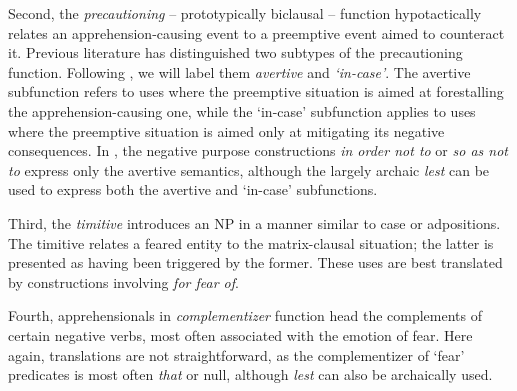 \documentclass[output=paper,colorlinks,citecolor=brown]{langscibook}
\begin{document}
{Second, the \emph{precautioning} -- prototypically biclausal -- function hypotactically relates an apprehension-causing event to a preemptive event aimed to counteract it. Previous literature has distinguished two subtypes of the precautioning function. Following \citet{lichtenberk1995apprehensional}, we will label them \textit{avertive} and \textit{`in-case'}. The avertive subfunction refers to uses where the preemptive situation is aimed at forestalling the apprehension-causing one, while the `in-case' subfunction applies to uses where the preemptive situation is aimed only at mitigating its negative consequences. In , the negative purpose constructions \textit{in order not to} or \textit{so as not to} express only the avertive semantics, although the largely archaic \textit{lest} can be used to express both the avertive and `in-case' subfunctions.}

Third, the \emph{timitive} introduces an NP in a manner similar to case or adpositions. The timitive relates a feared entity to the matrix-clausal situation; the latter is presented as having been triggered by the former. These uses are best translated by  constructions involving \textit{for fear of}.

Fourth, apprehensionals in \textit{complementizer} function head the complements of certain negative verbs, most often associated with the emotion of fear. Here again,  translations are not straightforward, as the complementizer of `fear' predicates is most often \textit{that} or null, although \textit{lest} can also be archaically used. 
\end{document}
